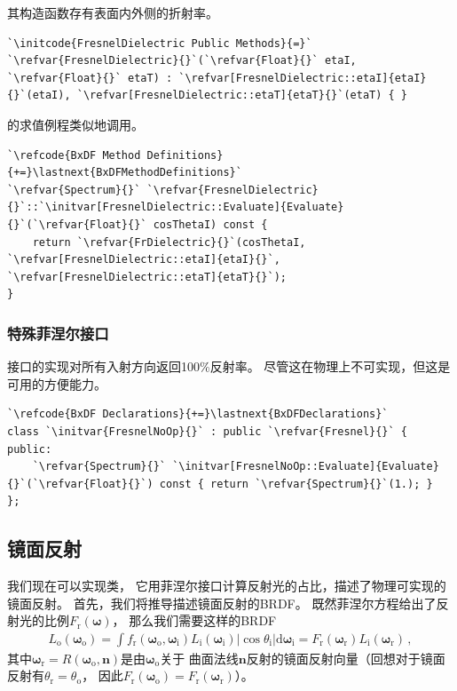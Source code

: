 其构造函数存有表面内外侧的折射率。
\begin{lstlisting}
`\initcode{FresnelDielectric Public Methods}{=}`
`\refvar{FresnelDielectric}{}`(`\refvar{Float}{}` etaI, `\refvar{Float}{}` etaT) : `\refvar[FresnelDielectric::etaI]{etaI}{}`(etaI), `\refvar[FresnelDielectric::etaT]{etaT}{}`(etaT) { }
\end{lstlisting}

的求值例程类似地调用。
\begin{lstlisting}
`\refcode{BxDF Method Definitions}{+=}\lastnext{BxDFMethodDefinitions}`
`\refvar{Spectrum}{}` `\refvar{FresnelDielectric}{}`::`\initvar[FresnelDielectric::Evaluate]{Evaluate}{}`(`\refvar{Float}{}` cosThetaI) const {
    return `\refvar{FrDielectric}{}`(cosThetaI, `\refvar[FresnelDielectric::etaI]{etaI}{}`, `\refvar[FresnelDielectric::etaT]{etaT}{}`);
}
\end{lstlisting}

\subsubsection*{特殊菲涅尔接口}
接口的实现对所有入射方向返回100\%反射率。
尽管这在物理上不可实现，但这是可用的方便能力。
\begin{lstlisting}
`\refcode{BxDF Declarations}{+=}\lastnext{BxDFDeclarations}`
class `\initvar{FresnelNoOp}{}` : public `\refvar{Fresnel}{}` {
public:
    `\refvar{Spectrum}{}` `\initvar[FresnelNoOp::Evaluate]{Evaluate}{}`(`\refvar{Float}{}`) const { return `\refvar{Spectrum}{}`(1.); }
};
\end{lstlisting}

\subsection{镜面反射}\label{sub:镜面反射}
我们现在可以实现类，
它用菲涅尔接口计算反射光的占比，描述了物理可实现的镜面反射。
首先，我们将推导描述镜面反射的BRDF。
既然菲涅尔方程给出了反射光的比例$F_{\mathrm{r}}({\bm\omega})$，
那么我们需要这样的BRDF
\begin{align*}
    L_{\mathrm{o}}({\bm\omega}_{\mathrm{o}})=\int{f_{\mathrm{r}}({\bm\omega}_{\mathrm{o}},{\bm\omega}_{\mathrm{i}})L_{\mathrm{i}}({\bm\omega}_{\mathrm{i}})|\cos\theta_{\mathrm{i}}|\mathrm{d}{\bm\omega}_{\mathrm{i}}}=F_{\mathrm{r}}({\bm\omega}_{\mathrm{r}})L_{\mathrm{i}}({\bm\omega}_{\mathrm{r}})\, ,
\end{align*}
其中${\bm\omega}_{\mathrm{r}}=R({\bm\omega}_{\mathrm{o}},{\bm n})$是由${\bm\omega}_{\mathrm{o}}$关于
曲面法线$\bm n$反射的镜面反射向量（回想对于镜面反射有$\theta_{\mathrm{r}}=\theta_{\mathrm{o}}$，
因此$F_{\mathrm{r}}({\bm\omega}_{\mathrm{o}})=F_{\mathrm{r}}({\bm\omega}_{\mathrm{r}})$）。

